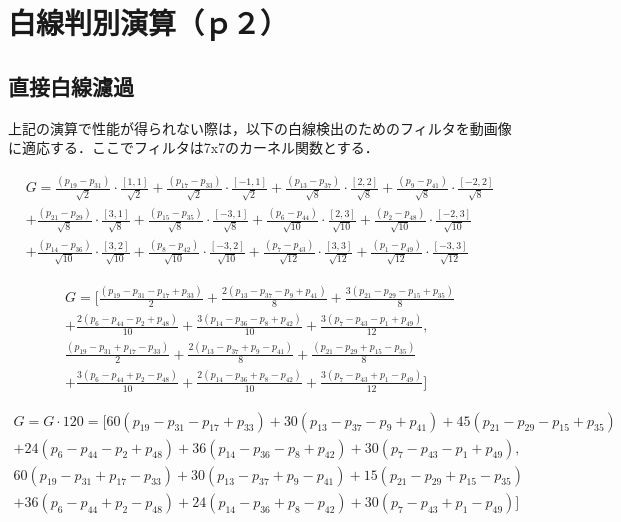 \documentclass{jsarticle}
\begin{document}
\section{白線判別演算（ｐ２）}
\label{白線判別演算（ｐ２）}

\subsection{直接白線濾過}
\label{直接白線濾過}

上記の演算で性能が得られない際は，以下の白線検出のためのフィルタを動画像に適応する．ここでフィルタは7x7のカーネル関数とする．

\[
\begin{split}
G
=\frac{(p_{19}-p_{31})}{\sqrt{2}} \cdot \frac{[1,1]}{\sqrt{2}}
+\frac{(p_{17}-p_{33})}{\sqrt{2}} \cdot \frac{[-1,1]}{\sqrt{2}}
+\frac{(p_{13}-p_{37})}{\sqrt{8}} \cdot \frac{[2,2]}{\sqrt{8}}
+\frac{(p_{9}-p_{41})}{\sqrt{8}} \cdot \frac{[-2,2]}{\sqrt{8}} \\
+\frac{(p_{21}-p_{29})}{\sqrt{8}} \cdot \frac{[3,1]}{\sqrt{8}}
+\frac{(p_{15}-p_{35})}{\sqrt{8}} \cdot \frac{[-3,1]}{\sqrt{8}}
+\frac{(p_{6}-p_{44})}{\sqrt{10}} \cdot \frac{[2,3]}{\sqrt{10}}
+\frac{(p_{2}-p_{48})}{\sqrt{10}} \cdot \frac{[-2,3]}{\sqrt{10}}  \\
+\frac{(p_{14}-p_{36})}{\sqrt{10}} \cdot \frac{[3,2]}{\sqrt{10}}
+\frac{(p_{8}-p_{42})}{\sqrt{10}} \cdot \frac{[-3,2]}{\sqrt{10}}
+\frac{(p_{7}-p_{43})}{\sqrt{12}} \cdot \frac{[3,3]}{\sqrt{12}}
+\frac{(p_{1}-p_{49})}{\sqrt{12}} \cdot \frac{[-3,3]}{\sqrt{12}} 
\end{split}
\]

\[
\begin{split}
G
=[\frac{(p_{19} - p_{31} - p_{17} + p_{33})}{2}
+\frac{2(p_{13} - p_{37} - p_{9} + p_{41})}{8}
+\frac{3(p_{21} - p_{29} - p_{15} + p_{35})}{8} \\
+\frac{2(p_{6} - p_{44} - p_{2} + p_{48})}{10}
+\frac{3(p_{14} - p_{36} - p_{8} + p_{42})}{10}
+\frac{3(p_{7} - p_{43} - p_{1} + p_{49})}{12}, \\
\frac{(p_{19} - p_{31} + p_{17} - p_{33})}{2} 
+\frac{2(p_{13} - p_{37} + p_{9} - p_{41})}{8}
+\frac{(p_{21} - p_{29} + p_{15} - p_{35})}{8} \\
+\frac{3(p_{6} - p_{44} + p_{2} - p_{48})}{10}
+\frac{2(p_{14} - p_{36} + p_{8} - p_{42})}{10}
+\frac{3(p_{7} - p_{43} + p_{1} - p_{49})}{12}
]
\end{split}
\]

\[
\begin{split}
G=G \cdot 120
=[60(p_{19} - p_{31} - p_{17} + p_{33})
+30(p_{13} - p_{37} - p_{9} + p_{41})
+45(p_{21} - p_{29} - p_{15} + p_{35}) \\
+24(p_{6} - p_{44} - p_{2} + p_{48})
+36(p_{14} - p_{36} - p_{8} + p_{42})
+30(p_{7} - p_{43} - p_{1} + p_{49}), \\
60(p_{19} - p_{31} + p_{17} - p_{33}) 
+30(p_{13} - p_{37} + p_{9} - p_{41})
+15(p_{21} - p_{29} + p_{15} - p_{35}) \\
+36(p_{6} - p_{44} + p_{2} - p_{48})
+24(p_{14} - p_{36} + p_{8} - p_{42})
+30(p_{7} - p_{43} + p_{1} - p_{49})
]
\end{split}
\]
\end{document}
